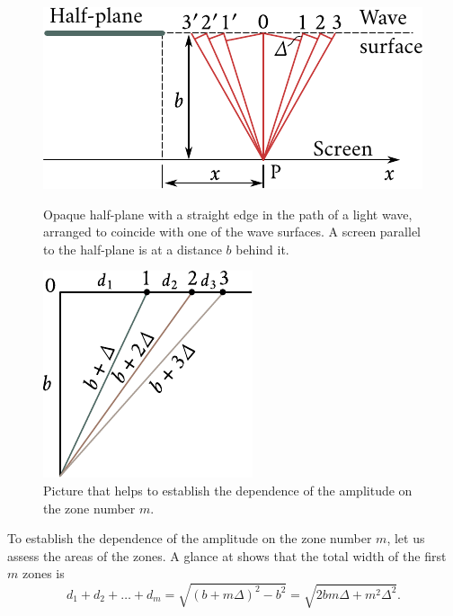 \begin{figure}[!htb]
	\begin{minipage}[t]{0.58\linewidth}
		\begin{center}
			\includegraphics[scale=0.95]{figures/ch_18/fig_18_15.pdf}
            \caption[]{Opaque half-plane with a straight edge in the path of a light wave, arranged to coincide with one of the wave surfaces. A screen parallel to the half-plane is at a distance $b$ behind it.}
			\label{fig:18_15}
		\end{center}
	\end{minipage}
	\hfill{ }%
	\begin{minipage}[t]{0.38\linewidth}
		\begin{center}
			\includegraphics[scale=0.95]{figures/ch_18/fig_18_16.pdf}
			\caption[]{Picture that helps to establish the dependence of the amplitude on the zone number $m$.}
			\label{fig:18_16}
		\end{center}
	\end{minipage}
\vspace{-0.4cm}
\end{figure}

To establish the dependence of the amplitude on the zone number $m$, let us assess the areas of the zones.
A glance at  shows that the total width of the first $m$ zones is
\begin{equation*}
	d_1 + d_2 + \ldots + d_m = \sqrt{(b+m\Delta)^2 - b^2} = \sqrt{2bm\Delta + m^2\Delta^2}.
\end{equation*}

